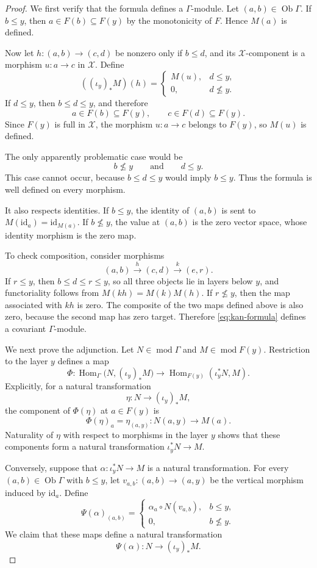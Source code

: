 \documentclass[12pt,a4paper,english,reqno]{amsart}
\theoremstyle{plain}
\theoremstyle{definition}
\newcommand{\Hom}{\operatorname{Hom}}
\newcommand{\id}{\mathrm{id}}
\newcommand{\X}{\mathcal X}
\newcommand{\G}{\Gamma}
\newcommand{\modu}{\operatorname{mod}}
\begin{document}
\begin{proof}
We first verify that the formula defines a $\G$-module. Let $(a,b)\in\operatorname{Ob}\G$.
If $b\leq y$, then $a\in F(b)\subseteq F(y)$
by the monotonicity of $F$. Hence $M(a)$ is defined.

Now let $h:(a,b)\longrightarrow(c,d)$ be nonzero only if
$b\leq d$, and its $\X$-component is a morphism
$ u:a\longrightarrow c$
in $\X$. Define
\[
((\iota_y)_*M)(h)
=
\begin{cases}
M(u), & d\leq y,\\
0,    & d\nleq y.
\end{cases}
\]
If $d\leq y$, then $b\leq d\leq y$, and therefore
\[
a\in F(b)\subseteq F(y),
\qquad
c\in F(d)\subseteq F(y).
\]
Since $F(y)$ is full in $\X$, the morphism $u:a\to c$ belongs to
$F(y)$, so $M(u)$ is defined.

The only apparently problematic case would be
\[
b\nleq y
\qquad\text{and}\qquad
d\leq y.
\]
This case cannot occur, because $b\leq d\leq y$ would imply
$b\leq y$. Thus the formula is well defined on every morphism.

It also respects identities. If $b\leq y$, the identity of $(a,b)$ is
sent to $M(\id_a)=\id_{M(a)}$.
If $b\nleq y$, the value at $(a,b)$ is the zero vector space, whose
identity morphism is the zero map.

To check composition, consider morphisms
\[
(a,b)\xrightarrow{h}(c,d)\xrightarrow{k}(e,r).
\]
If $r\leq y$, then $b\leq d\leq r\leq y$,
so all three objects lie in layers below $y$, and functoriality follows
from $M(kh)=M(k)M(h)$.
If $r\nleq y$, then the map associated with $kh$ is zero. The composite
of the two maps defined above is also zero, because the second map has
zero target. Therefore \eqref{eq:kan-formula} defines a covariant
$\G$-module.

We next prove the adjunction. Let $N\in\modu\G$ and
$M\in\modu F(y)$. Restriction to the layer $y$ defines a map
\[
\Phi:
\Hom_{\G}\bigl(N,(\iota_y)_*M\bigr)
\longrightarrow
\Hom_{F(y)}(\iota_y^*N,M).
\]
Explicitly, for a natural transformation
\[
\eta:N\longrightarrow(\iota_y)_*M,
\]
the component of $\Phi(\eta)$ at $a\in F(y)$ is
\[
\Phi(\eta)_a=\eta_{(a,y)}:
N(a,y)\longrightarrow M(a).
\]
Naturality of $\eta$ with respect to morphisms in the layer $y$ shows
that these components form a natural transformation $\iota_y^*N\longrightarrow M$.


Conversely, suppose that $\alpha:\iota_y^*N\longrightarrow M$
is a natural transformation. For every $(a,b)\in\operatorname{Ob}\G$
with $b\leq y$, let $v_{a,b}:(a,b)\longrightarrow(a,y)$
be the vertical morphism induced by $\id_a$. Define
\[
\Psi(\alpha)_{(a,b)}
=
\begin{cases}
\alpha_a\circ N(v_{a,b}), & b\leq y,\\
0,                         & b\nleq y.
\end{cases}
\]
We claim that these maps define a natural transformation
\[
\Psi(\alpha):N\longrightarrow(\iota_y)_*M.
\]


\end{proof}
\end{document}

